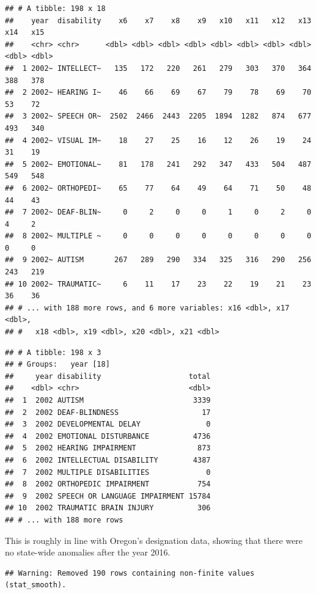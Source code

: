 \documentclass[
  english,
  man]{apa6}
\begin{document}
\begin{verbatim}
## # A tibble: 198 x 18
##    year  disability    x6    x7    x8    x9   x10   x11   x12   x13   x14   x15
##    <chr> <chr>      <dbl> <dbl> <dbl> <dbl> <dbl> <dbl> <dbl> <dbl> <dbl> <dbl>
##  1 2002~ INTELLECT~   135   172   220   261   279   303   370   364   388   378
##  2 2002~ HEARING I~    46    66    69    67    79    78    69    70    53    72
##  3 2002~ SPEECH OR~  2502  2466  2443  2205  1894  1282   874   677   493   340
##  4 2002~ VISUAL IM~    18    27    25    16    12    26    19    24    31    19
##  5 2002~ EMOTIONAL~    81   178   241   292   347   433   504   487   549   548
##  6 2002~ ORTHOPEDI~    65    77    64    49    64    71    50    48    44    43
##  7 2002~ DEAF-BLIN~     0     2     0     0     1     0     2     0     4     2
##  8 2002~ MULTIPLE ~     0     0     0     0     0     0     0     0     0     0
##  9 2002~ AUTISM       267   289   290   334   325   316   290   256   243   219
## 10 2002~ TRAUMATIC~     6    11    17    23    22    19    21    23    36    36
## # ... with 188 more rows, and 6 more variables: x16 <dbl>, x17 <dbl>,
## #   x18 <dbl>, x19 <dbl>, x20 <dbl>, x21 <dbl>
\end{verbatim}

\begin{verbatim}
## # A tibble: 198 x 3
## # Groups:   year [18]
##     year disability                    total
##    <dbl> <chr>                         <dbl>
##  1  2002 AUTISM                         3339
##  2  2002 DEAF-BLINDNESS                   17
##  3  2002 DEVELOPMENTAL DELAY               0
##  4  2002 EMOTIONAL DISTURBANCE          4736
##  5  2002 HEARING IMPAIRMENT              873
##  6  2002 INTELLECTUAL DISABILITY        4387
##  7  2002 MULTIPLE DISABILITIES             0
##  8  2002 ORTHOPEDIC IMPAIRMENT           754
##  9  2002 SPEECH OR LANGUAGE IMPAIRMENT 15784
## 10  2002 TRAUMATIC BRAIN INJURY          306
## # ... with 188 more rows
\end{verbatim}

This is roughly in line with Oregon's designation data, showing that there were no state-wide anomalies after the year 2016.

\begin{verbatim}
## Warning: Removed 190 rows containing non-finite values (stat_smooth).
\end{verbatim}
\end{document}
